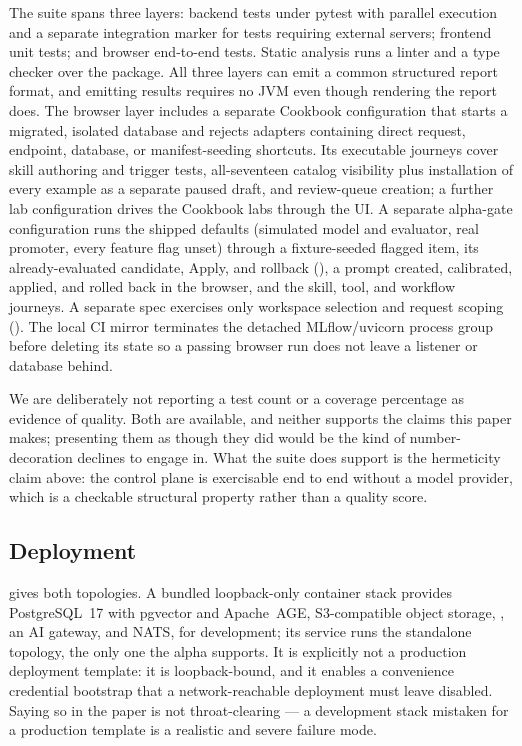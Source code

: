 The suite spans three layers: backend tests under pytest with parallel execution
and a separate integration marker for tests requiring external servers; frontend
unit tests; and browser end-to-end tests. Static analysis runs a linter and a type
checker over the package. All three layers can emit a common structured report
format, and emitting results requires no JVM even though rendering the report does.
The browser layer includes a separate Cookbook configuration that starts a migrated,
isolated database and rejects adapters containing direct request, endpoint, database,
or manifest-seeding shortcuts.  Its executable journeys cover skill authoring and
trigger tests, all-seventeen catalog visibility plus installation of every example as
a separate paused draft, and review-queue creation; a further lab configuration
drives the Cookbook labs through the UI.  A separate alpha-gate configuration runs
the shipped defaults (simulated model and evaluator, real \mlflow{} promoter, every
feature flag unset) through a fixture-seeded flagged item, its already-evaluated
candidate, Apply, and rollback (), a prompt
created, calibrated, applied, and rolled back in the browser, and the skill, tool,
and workflow journeys.  A separate spec exercises only workspace selection and
request scoping ().  The local CI mirror terminates the detached
MLflow/uvicorn process group before deleting its state so a passing browser run does
not leave a listener or database behind.

We are deliberately not reporting a test count or a coverage percentage as evidence
of quality. Both are available, and neither supports the claims this paper makes;
presenting them as though they did would be the kind of number-decoration
 declines to engage in. What the suite does support is the
hermeticity claim above: the control plane is exercisable end to end without a model
provider, which is a checkable structural property rather than a quality score.

\subsection{Deployment}

 gives both topologies. A bundled loopback-only container
stack provides PostgreSQL~17 with pgvector and Apache~AGE, S3-compatible object
storage, \mlflow{}, an AI gateway, and NATS, for development; its \sys{} service
runs the standalone topology, the only one the alpha supports. It is explicitly not
a production deployment template: it is loopback-bound, and it enables a
convenience credential bootstrap that a network-reachable deployment must leave
disabled. Saying so in the paper is not throat-clearing --- a development stack
mistaken for a production template is a realistic and severe failure mode.

